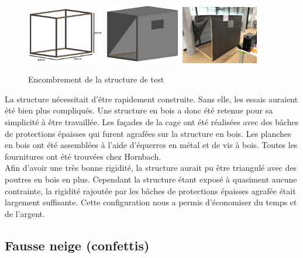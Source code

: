 \begin{figure}[H]
    \centering
    \includegraphics[width=0.3\textwidth]{Images/photos_PGA/P004_CageDeTest21.png}
    \includegraphics[width=0.3\textwidth]{Images/photos_PGA/P004_CageDeTest2.png}
    \includegraphics[width=0.3\textwidth]{Images/photos_PGA/IMG_0442.jpg}
    \caption{Encombrement de la structure de test}
    \label{fig:encombrement}
\end{figure}

La structure nécessitait d’être rapidement construite. Sans elle, les essais auraient été bien plus 
compliqués. Une structure en bois a donc été retenue pour sa simplicité à être travaillée. Les façades 
de la cage ont été réalisées avec des bâches de protections épaisses qui furent agrafées sur la structure 
en bois. Les planches en bois ont été assemblées à l’aide d’équerres en métal et de vis à bois. Toutes 
les fournitures ont été trouvées chez Hornbach.\\
Afin d’avoir une très bonne rigidité, la structure aurait pu être triangulé avec des poutres en bois en 
plus. Cependant la structure étant exposé à quasiment aucune contrainte, la rigidité rajoutée par les 
bâches de protections épaisses agrafée était largement suffisante. Cette configuration nous a permis 
d’économiser du temps et de l’argent.

\subsection{Fausse neige (confettis)}

